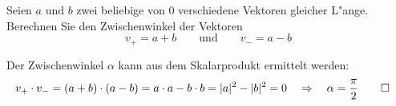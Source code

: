 Seien $a$ und $b$ zwei beliebige von $0$ verschiedene Vektoren gleicher L"ange.
Berechnen Sie den Zwischenwinkel der Vektoren
\[
v_+=a+b
\qquad\text{und}\qquad
v_-=a -b
\]

\begin{loesung}
Der Zwischenwinkel  $\alpha$ kann aus dem Skalarprodukt ermittelt werden:
\begin{align*}
v_+\cdot v_-
&=
(a+b) \cdot (a-b)
=
a\cdot a-b\cdot b=|a|^2-|b|^2=0\quad\Rightarrow\quad \alpha=\frac{\pi}2
\qedhere
\end{align*}
\end{loesung}

